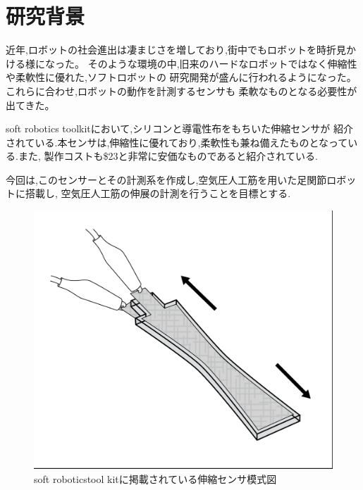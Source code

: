 \section{研究背景}
近年,ロボットの社会進出は凄まじさを増しており,街中でもロボットを時折見かける様になった。
そのような環境の中,旧来のハードなロボットではなく伸縮性や柔軟性に優れた,ソフトロボットの
研究開発が盛んに行われるようになった。これらに合わせ,ロボットの動作を計測するセンサも
柔軟なものとなる必要性が出てきた。

soft robotics toolkit\cite{MITSoftRobot}において,シリコンと導電性布をもちいた伸縮センサが
紹介されている.本センサは,伸縮性に優れており,柔軟性も兼ね備えたものとなっている.また,
製作コストも\$23と非常に安価なものであると紹介されている.

今回は,このセンサーとその計測系を作成し,空気圧人工筋を用いた足関節ロボットに搭載し,
空気圧人工筋の伸展の計測を行うことを目標とする.
\begin{figure}[h]
    \begin{center}
        \includegraphics[width=0.5\columnwidth,bb=0 0 906 785]{Photo/BackGround/MITSoftRobotics.png}
        \caption{soft roboticstool kitに掲載されている伸縮センサ模式図\cite{MITSoftRobot}}
        \label{MITSoftRobot表紙}
    \end{center}
\end{figure}


